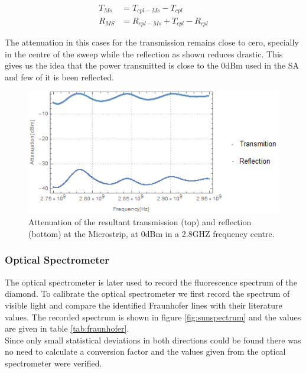 \begin{align}
T_{Ms}&=T_{cpl-Ms}-T_{cpl}\\
R_{MS}&=R_{cpl-Ms}+T_{cpl}-R_{cpl}
\end{align}


The attenuation in this cases for the transmission remains close to cero, specially in the centre of the sweep while the reflection as shown reduces drastic. This gives us the idea that the power transmitted is close to the 0dBm used in the SA and few of it is been reflected.

\begin{figure}
	\centering
	\includegraphics[width=0.7\linewidth]{../figures/microstrip-trasm-eflect}
	\caption[trans-refl]{Attenuation of the resultant transmission (top) and reflection (bottom) at the Microstrip, at 0dBm in a 2.8GHZ frequency centre.}
	\label{fig:microstrip-trasm-eflect}
\end{figure}

\subsubsection{Optical Spectrometer}
The optical spectrometer is later used to record the fluorescence spectrum of the diamond. To calibrate the optical spectrometer we first record the spectrum of visible light and compare the identified Fraunhofer lines with their literature values. The recorded spectrum is shown in figure \ref{fig:sunspectrum} and the values are given in table \ref{tab:fraunhofer}.\\

Since only small statistical deviations in both directions could be found there was no need to calculate a conversion factor and the values given from the optical spectrometer were verified. \\

